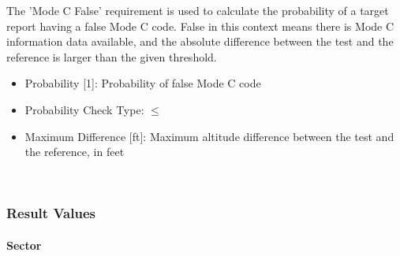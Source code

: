 The 'Mode C False' requirement is used to calculate the probability of a target report having a false Mode C code. False in this context means there is Mode C information data available, and the absolute difference between the test and the reference is larger than the given threshold. \\

\begin{itemize}  
\item Probability [1]: Probability of false Mode C code
\item Probability Check Type: $\leq$
\item Maximum Difference [ft]: Maximum altitude difference between the test and the reference, in feet
\end{itemize}
\ \\

\subsubsection{Result Values}

\paragraph{Sector}

